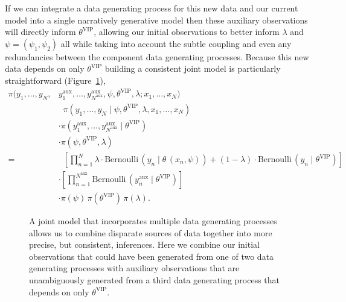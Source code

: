 \documentclass[
  letterpaper,
  DIV=11,
  numbers=noendperiod]{scrartcl}
\begin{document}
If we can integrate a data generating process for this new data and our
current model into a single narratively generative model then these
auxiliary observations will directly inform \(\theta^{\text{VIP}}\),
allowing our initial observations to better inform \(\lambda\) and
\(\psi = (\psi_{1}, \psi_{2})\) all while taking into account the subtle
coupling and even any redundancies between the component data generating
processes. Because this new data depends on only \(\theta^{\text{VIP}}\)
building a consistent joint model is particularly straightforward
(Figure~\ref{fig-model4}), \begin{align*}
\pi(y_{1}, \ldots, y_{N}, &
    y^{\text{aux}}_{1}, \ldots, y^{\text{aux}}_{N^{\text{aux}}},
    \psi, \theta^{\text{VIP}}, \lambda; x_{1}, \ldots, x_{N})
\\
& \;\; \pi(y_{1}, \ldots, y_{N} \mid
           \psi, \theta^{\text{VIP}}, \lambda, x_{1}, \ldots, x_{N})
\\
& \cdot \pi(y^{\text{aux}}_{1}, \ldots, y^{\text{aux}}_{N^{\text{aux}}} \mid
            \theta^{\text{VIP}})
\\
& \cdot \pi(\psi, \theta^{\text{VIP}}, \lambda)
\\
=& \;\;
\left[ \prod_{n = 1}^{N}
\lambda \cdot
\text{Bernoulli} \,(y_{n} \mid \theta \, (x_{n}, \psi))
+ (1 - \lambda) \cdot
\text{Bernoulli} \,(y_{n} \mid \theta^{\text{VIP}}) \right]
\\
& \cdot
\left[ \prod_{n = 1}^{N^{\text{aux}}}
\text{Bernoulli} \,(y^{\text{aux}}_{n} \mid \theta^{\text{VIP}}) \right]
\\
& \cdot
\pi(\psi) \, \pi(\theta^{\text{VIP}}) \, \pi(\lambda).
\end{align*}

\begin{figure}


\caption{\label{fig-model4}A joint model that incorporates multiple data
generating processes allows us to combine disparate sources of data
together into more precise, but consistent, inferences. Here we combine
our initial observations that could have been generated from one of two
data generating processes with auxiliary observations that are
unambiguously generated from a third data generating process that
depends on only \(\theta^{\text{VIP}}\).}

\end{figure}%
\end{document}
